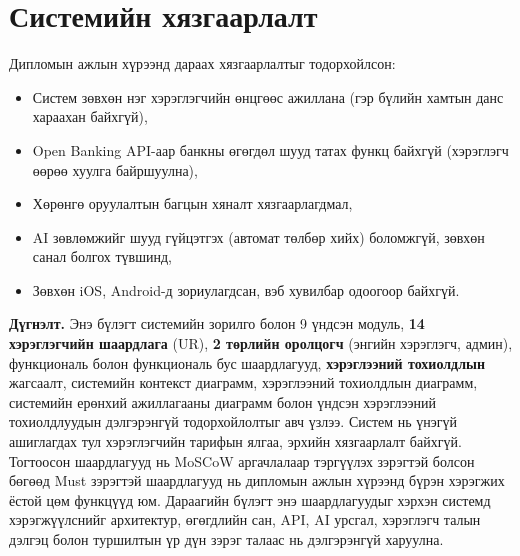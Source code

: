 \section{Системийн хязгаарлалт}
Дипломын ажлын хүрээнд дараах хязгаарлалтыг тодорхойлсон:
\begin{itemize}
    \item Систем зөвхөн нэг хэрэглэгчийн өнцгөөс ажиллана (гэр бүлийн хамтын данс хараахан байхгүй),
    \item Open Banking API-аар банкны өгөгдөл шууд татах функц байхгүй (хэрэглэгч өөрөө хуулга байршуулна),
    \item Хөрөнгө оруулалтын багцын хяналт хязгаарлагдмал,
    \item AI зөвлөмжийг шууд гүйцэтгэх (автомат төлбөр хийх) боломжгүй, зөвхөн санал болгох түвшинд,
    \item Зөвхөн iOS, Android-д зориулагдсан, вэб хувилбар одоогоор байхгүй.
\end{itemize}

\textbf{Дүгнэлт.} Энэ бүлэгт системийн зорилго болон 9 үндсэн модуль, \textbf{14 хэрэглэгчийн шаардлага} (UR), \textbf{2 төрлийн оролцогч} (энгийн хэрэглэгч, админ), функциональ болон функциональ бус шаардлагууд, \textbf{хэрэглээний тохиолдлын} жагсаалт, системийн контекст диаграмм, хэрэглээний тохиолдлын диаграмм, системийн ерөнхий ажиллагааны диаграмм болон үндсэн хэрэглээний тохиолдлуудын дэлгэрэнгүй тодорхойлолтыг авч үзлээ. Систем нь үнэгүй ашиглагдах тул хэрэглэгчийн тарифын ялгаа, эрхийн хязгаарлалт байхгүй. Тогтоосон шаардлагууд нь MoSCoW аргачлалаар тэргүүлэх зэрэгтэй болсон бөгөөд Must зэрэгтэй шаардлагууд нь дипломын ажлын хүрээнд бүрэн хэрэгжих ёстой цөм функцүүд юм. Дараагийн бүлэгт энэ шаардлагуудыг хэрхэн системд хэрэгжүүлснийг архитектур, өгөгдлийн сан, API, AI урсгал, хэрэглэгч талын дэлгэц болон туршилтын үр дүн зэрэг талаас нь дэлгэрэнгүй харуулна.
